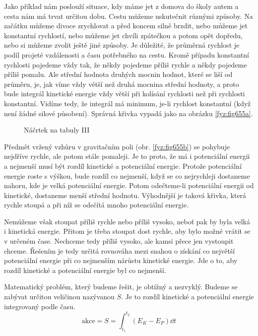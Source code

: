     Jako příklad nám poslouží situace, kdy máme jet z domova do školy autem a cesta nám má trvat
    určitou dobu. Cestu můžeme uskutečnit různými způsoby. Na začátku můžeme divoce zrychlovat a
    před koncem silně brzdit, nebo můžeme jet konstantní rychlostí, nebo můžeme jet chvíli zpátečkou
    a potom opět dopředu, nebo si můžeme zvolit ještě jiné způsoby. Je důležité, že průměrná
    rychlost je podíl projeté vzdálenosti a času potřebného na cestu. Kromě případu konstantní
    rychlosti pojedeme vždy tak, že někdy pojedeme příliš rychle a někdy pojedeme příliš pomalu. Ale
    střední hodnota druhých mocnin hodnot, které se liší od průměru, je, jak víme vždy větší než
    druhá mocnina střední hodnoty, a proto bude integrál kinetické energie vždy větší při kolísání
    rychlosti než při rychlosti konstantní. Vidíme tedy, že integrál má minimum, je-li rychlost
    konstantní (když není žádné silové působení). Správná křivka vypadá jako na obrázku
    \ref{fyz:fig655a}.
    
    \begin{figure}[ht!]
      \centering
        \hfill
      \caption{Náčrtek na tabuly III}
      \label{fyz:fig655}
    \end{figure}

    Předmět vržený vzhůru v gravitačním poli (obr. \ref{fyz:fig655b}) se pohybuje nejdříve rychle,
    ale potom stále pomaleji. Je to proto, že má i potenciální energii a nejmenší musí být rozdíl
    kinetické a potenciální energie. Protože potenciální energie roste s výškou, bude rozdíl co
    nejmenší, když se co nejrychleji dostaneme nahoru, kde je velká potenciální energie. Potom
    odečteme-li potenciální energii od kinetické, dostaneme menší střední hodnotu. Výhodnější je
    taková křivka, která rychle stoupá a při níž se odečítá mnoho potenciální energie.

    Nemůžeme však stoupat příliš rychle nebo příliš vysoko, neboť pak by byla velká i kinetická
    energie. Přitom je třeba stoupat dost rychle, aby bylo možné vrátit se v určeném čase. Nechceme
    tedy příliš vysoko, ale kamsi přece jen vystoupit chceme. Řešením je tedy určitá rovnováha mezi
    snahou o získání co největší potenciální energie při co nejmenším nárůstu kinetické energie. Jde
    o to, aby rozdíl kinetické a potenciální energie byl co nejmenší.

    Matematický problém, který budeme řešit, je obtížný a nezvyklý. Budeme se zabývat určitou
    veličinou nazývanou  \(S\). Je to rozdíl kinetické a potenciální energie
    integrovaný podle času.
    \begin{equation*}
      \text{akce} = S = \int_{t_1}^{t_2}\left(E_K - E_P\right)\dd{t}
    \end{equation*}

